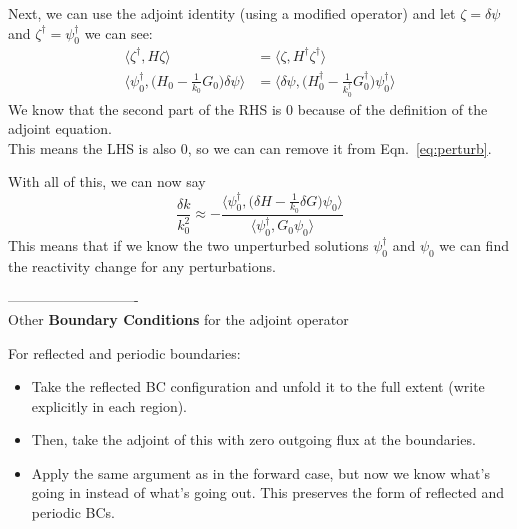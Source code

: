 \documentclass[12pt]{article}
\begin{document}
Next, we can use the adjoint identity (using a modified operator) and let $\zeta = \delta\psi$ and $\zeta^{\dagger} = \psi_0^{\dagger}$ we can see:
\begin{align*}
\langle\zeta^{\dagger}, H \zeta\rangle &= \langle\zeta, H^{\dagger} \zeta^{\dagger}\rangle \\
%
\langle \psi_0^{\dagger}, \bigl(H_0 - \frac{1}{k_0}G_0 \bigr)\delta \psi \rangle &= \langle \delta \psi,  \bigl(H_0^{\dagger} - \frac{1}{k_0^{\dagger}}G_0^{\dagger} \bigr)\psi_0^{\dagger} \rangle
\end{align*}
We know that the second part of the RHS is $0$ because of the definition of the adjoint equation.\\
This means the LHS is also $0$, so we can can remove it from Eqn.~\ref{eq:perturb}.

With all of this, we can now say
\[
\frac{\delta k}{k_0^2} \approx -\frac{\langle \psi_0^{\dagger},\bigl(\delta H - \frac{1}{k_0}\delta G\bigr)\psi_0 \rangle}{\langle \psi_0^{\dagger}, G_0\psi_0 \rangle}
\]
This means that if we know the two unperturbed solutions $\psi_0^{\dagger}$ and $\psi_0$ we can find the reactivity change for any perturbations.

----------------------------\\
Other \textbf{Boundary Conditions} for the adjoint operator

For reflected and periodic boundaries:
\begin{itemize}
\item Take the reflected BC configuration and unfold it to the full extent (write explicitly in each region).
\item Then, take the adjoint of this with zero outgoing flux at the boundaries.
\item Apply the same argument as in the forward case, but now we know what's going in instead of what's going out. This preserves the form of reflected and periodic BCs.
\end{itemize}
\end{document}
